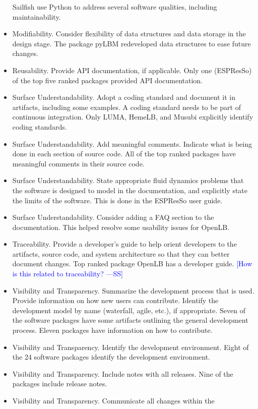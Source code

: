 \documentclass[final, 3p, times, authoryear]{elsarticle}
\newcommand{\authornote}[3]{\textcolor{#1}{[#3 ---#2]}}
\newcommand{\authornote}[3]{}
\newcommand{\wss}[1]{\authornote{blue}{SS}{#1}} %
\begin{document}
\begin{itemize}
	Sailfish use Python to address several software qualities, including
	maintainability.
	\item Modifiability. Consider flexibility of data structures and data
	storage in the design stage. The package pyLBM redeveloped data structures
	to ease future changes.
	\item Reusability. Provide API documentation, if applicable. Only one
	(ESPResSo) of the top five ranked packages provided API documentation.
	\item Surface Understandability. Adopt a coding standard and document it in
	artifacts, including some examples. A coding standard needs to be part of
	continuous integration. Only LUMA, HemeLB, and Musubi explicitly identify
	coding standards. 
	\item Surface Understandability. Add meaningful comments. Indicate what is
	being done in each section of source code. All of the top ranked packages
	have meaningful comments in their source code.
	\item Surface Understandability. State appropriate fluid dynamics problems
	that the software is designed to model in the documentation, and explicitly
	state the limits of the software. This is done in the ESPResSo user guide. 
	\item Surface Understandability. Consider adding a FAQ section to the
	documentation. This helped resolve some usability issues for OpenLB.
	\item Traceability. Provide a developer's guide to help orient developers to
	the artifacts, source code, and system architecture so that they can better
	document changes. Top ranked package OpenLB has a developer guide. \wss{How
	is this related to traceability?}
	\item Visibility and Transparency. Summarize the development process that is
	used. Provide information on how new users can contribute. Identify the
	development model by name (waterfall, agile, etc.), if appropriate.  Seven
	of the software packages have some artifacts outlining the general
	development process. Eleven packages have information on how to contribute. 
	\item Visibility and Transparency. Identify the development environment.
	Eight of the 24 software packages identify the development environment.
	\item Visibility and Transparency. Include notes with all releases. Nine of
	the packages include release notes.
	\item Visibility and Transparency. Communicate all changes within the

\end{itemize}
\end{document}
